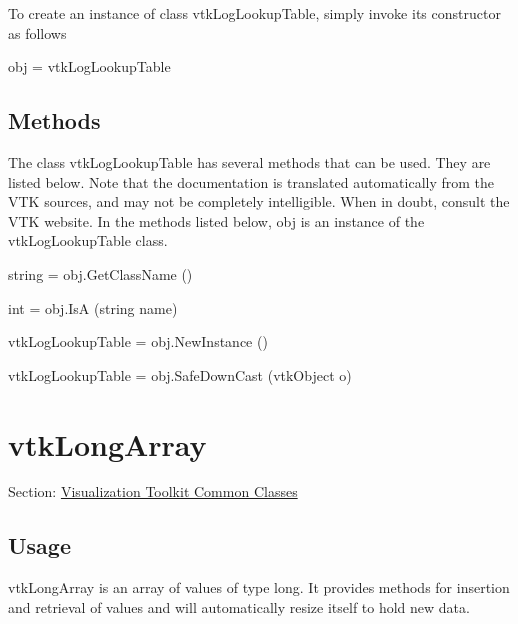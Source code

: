 To create an instance of class vtk\-Log\-Lookup\-Table, simply invoke its constructor as follows \begin{DoxyVerb}  obj = vtkLogLookupTable
\end{DoxyVerb}
 \hypertarget{vtkwidgets_vtkxyplotwidget_Methods}{}\subsection{Methods}\label{vtkwidgets_vtkxyplotwidget_Methods}
The class vtk\-Log\-Lookup\-Table has several methods that can be used. They are listed below. Note that the documentation is translated automatically from the V\-T\-K sources, and may not be completely intelligible. When in doubt, consult the V\-T\-K website. In the methods listed below, {\ttfamily obj} is an instance of the vtk\-Log\-Lookup\-Table class. 
\begin{DoxyItemize}
\item {\ttfamily string = obj.\-Get\-Class\-Name ()}  
\item {\ttfamily int = obj.\-Is\-A (string name)}  
\item {\ttfamily vtk\-Log\-Lookup\-Table = obj.\-New\-Instance ()}  
\item {\ttfamily vtk\-Log\-Lookup\-Table = obj.\-Safe\-Down\-Cast (vtk\-Object o)}  
\end{DoxyItemize}\hypertarget{vtkcommon_vtklongarray}{}\section{vtk\-Long\-Array}\label{vtkcommon_vtklongarray}
Section\-: \hyperlink{sec_vtkcommon}{Visualization Toolkit Common Classes} \hypertarget{vtkwidgets_vtkxyplotwidget_Usage}{}\subsection{Usage}\label{vtkwidgets_vtkxyplotwidget_Usage}
vtk\-Long\-Array is an array of values of type long. It provides methods for insertion and retrieval of values and will automatically resize itself to hold new data.

